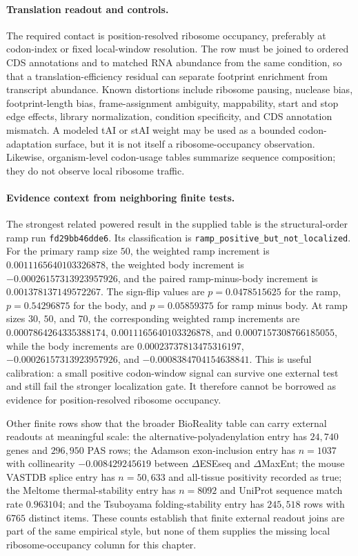 \paragraph{Translation readout and controls.}
The required contact is position-resolved ribosome occupancy, preferably at codon-index or fixed local-window resolution.  The row must be joined to ordered CDS annotations and to matched RNA abundance from the same condition, so that a translation-efficiency residual can separate footprint enrichment from transcript abundance.  Known distortions include ribosome pausing, nuclease bias, footprint-length bias, frame-assignment ambiguity, mappability, start and stop edge effects, library normalization, condition specificity, and CDS annotation mismatch.  A modeled tAI or stAI weight may be used as a bounded codon-adaptation surface, but it is not itself a ribosome-occupancy observation.  Likewise, organism-level codon-usage tables summarize sequence composition; they do not observe local ribosome traffic.

\paragraph{Evidence context from neighboring finite tests.}
The strongest related powered result in the supplied table is the structural-order ramp run \texttt{fd29bb46dde6}.  Its classification is \texttt{ramp\_positive\_but\_not\_localized}.  For the primary ramp size $50$, the weighted ramp increment is $0.0011165640103326878$, the weighted body increment is $-0.00026157313923957926$, and the paired ramp-minus-body increment is $0.001378137149572267$.  The sign-flip values are $p=0.0478515625$ for the ramp, $p=0.54296875$ for the body, and $p=0.05859375$ for ramp minus body.  At ramp sizes $30$, $50$, and $70$, the corresponding weighted ramp increments are $0.0007864264335388174$, $0.0011165640103326878$, and $0.0007157308766185055$, while the body increments are $0.00023737813475316197$, $-0.00026157313923957926$, and $-0.0008384704154638841$.  This is useful calibration: a small positive codon-window signal can survive one external test and still fail the stronger localization gate.  It therefore cannot be borrowed as evidence for position-resolved ribosome occupancy.

Other finite rows show that the broader BioReality table can carry external readouts at meaningful scale: the alternative-polyadenylation entry has $24{,}740$ genes and $296{,}950$ PAS rows; the Adamson exon-inclusion entry has $n=1037$ with collinearity $-0.008429245619$ between $\Delta$ESEseq and $\Delta$MaxEnt; the mouse VASTDB splice entry has $n=50{,}633$ and all-tissue positivity recorded as true; the Meltome thermal-stability entry has $n=8092$ and UniProt sequence match rate $0.963104$; and the Tsuboyama folding-stability entry has $245{,}518$ rows with $6765$ distinct items.  These counts establish that finite external readout joins are part of the same empirical style, but none of them supplies the missing local ribosome-occupancy column for this chapter.

